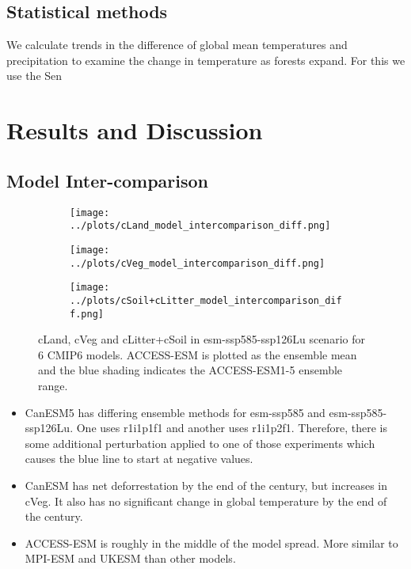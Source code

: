 \documentclass[]{article}
\begin{document}
\subsection{Statistical methods}

We calculate trends in the difference of global mean temperatures and precipitation to examine the change in temperature as forests expand. For this we use the Sen

\section{Results and Discussion}

\subsection{Model Inter-comparison}

\begin{figure}[H]
    \centering
    \begin{subfigure}[b]{0.45\linewidth}
        \texttt{[image: ../plots/cLand\_model\_intercomparison\_diff.png]}
    \end{subfigure}
    \begin{subfigure}[b]{0.45\linewidth}
        \texttt{[image: ../plots/cVeg\_model\_intercomparison\_diff.png]}
    \end{subfigure}
    \begin{subfigure}[b]{0.45\linewidth}
        \texttt{[image: ../plots/cSoil+cLitter\_model\_intercomparison\_diff.png]}
    \end{subfigure}
    \caption{cLand, cVeg and cLitter+cSoil in esm-ssp585-ssp126Lu scenario for 6 CMIP6 models. ACCESS-ESM is plotted as the ensemble mean and the blue shading indicates the ACCESS-ESM1-5 ensemble range.}
    \label{fig:models_cpools}
\end{figure}

\begin{itemize}
    \item CanESM5 has differing ensemble methods for esm-ssp585 and esm-ssp585-ssp126Lu. One uses r1i1p1f1 and another uses r1i1p2f1. Therefore, there is some additional perturbation applied to one of those experiments which causes the blue line to start at negative values.
    \item CanESM has net deforrestation by the end of the century, but increases in cVeg. It also has no significant change in global temperature by the end of the century.
    \item ACCESS-ESM is roughly in the middle of the model spread. More similar to MPI-ESM and UKESM than other models.
\end{itemize}
\end{document}
